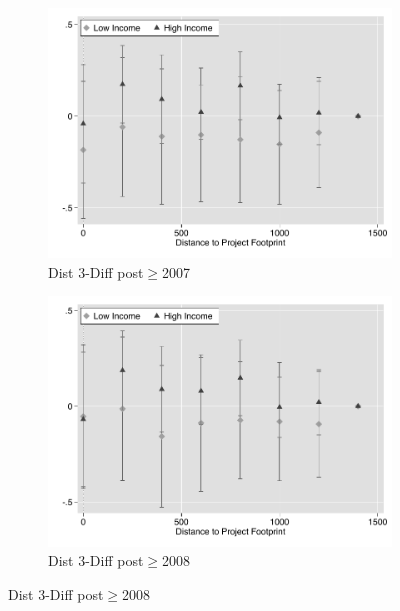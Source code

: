 \documentclass[12pt]{article}
\begin{document}
\begin{figure}
\begin{subfigure}[b]{0.48\textwidth}
        \end{subfigure}
 \begin{subfigure}[b]{0.48\textwidth}
                    \caption[Network2]%
            {{\footnotesize Dist 3-Diff post$\geq$2007}}    
            \label{fig:prefor}
            \centering
            \includegraphics[width=\textwidth,trim={0.3cm .3cm 0.1cm 0cm}, clip=true]{figures/price_dist_3d_no_ctrl_2007}
        \end{subfigure}
        \hfill
 \begin{subfigure}[b]{0.48\textwidth}
                    \caption[Network2]%
            {{\footnotesize Dist 3-Diff post$\geq$2008}}    
            \label{fig:prefor}
            \centering
            \includegraphics[width=\textwidth,trim={0.3cm .3cm 0.1cm 0cm}, clip=true]{figures/price_dist_3d_no_ctrl_2008}

\end{subfigure}
\end{figure}
\end{document}
